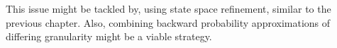 This issue might be tackled by, using state space refinement, similar to the previous chapter.
Also, combining  backward probability approximations of differing granularity might be a viable strategy.
